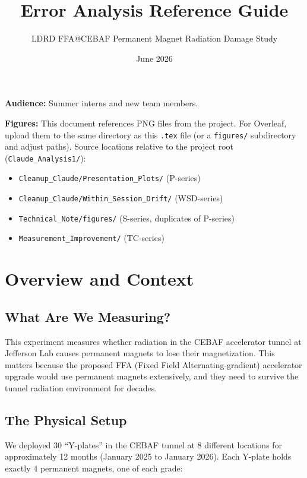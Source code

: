 \documentclass[11pt,letterpaper]{article}
\title{Error Analysis Reference Guide}
\author{LDRD FFA@CEBAF Permanent Magnet Radiation Damage Study}
\date{June 2026}
\begin{document}
\maketitle

\noindent\textbf{Audience:} Summer interns and new team members.

\bigskip\noindent\textbf{Figures:} This document references PNG files from the
project. For Overleaf, upload them to the same directory as this \texttt{.tex}
file (or a \texttt{figures/} subdirectory and adjust paths). Source locations
relative to the project root (\texttt{Claude\_Analysis1/}):
\begin{itemize}[nosep]
  \item \texttt{Cleanup\_Claude/Presentation\_Plots/} (P-series)
  \item \texttt{Cleanup\_Claude/Within\_Session\_Drift/} (WSD-series)
  \item \texttt{Technical\_Note/figures/} (S-series, duplicates of P-series)
  \item \texttt{Measurement\_Improvement/} (TC-series)
\end{itemize}

\tableofcontents
\newpage

\section{Overview and Context}
\label{sec:overview}

\subsection{What Are We Measuring?}

This experiment measures whether radiation in the CEBAF accelerator tunnel at
Jefferson Lab causes permanent magnets to lose their magnetization. This matters
because the proposed FFA (Fixed Field Alternating-gradient) accelerator upgrade
would use permanent magnets extensively, and they need to survive the tunnel
radiation environment for decades.

\subsection{The Physical Setup}

We deployed 30 ``Y-plates'' in the CEBAF tunnel at 8 different locations for
approximately 12 months (January 2025 to January 2026). Each Y-plate holds
exactly 4 permanent magnets, one of each grade:
\end{document}
